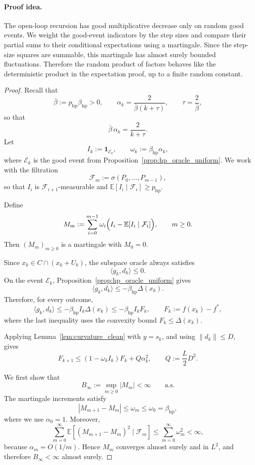 \documentclass{article}
\begin{document}
\paragraph{Proof idea.}
The open-loop recursion has good multiplicative decrease only on random good
events. We weight the good-event indicators by the step sizes and compare their
partial sums to their conditional expectations using a martingale. Since the
step-size squares are summable, this martingale has almost surely bounded
fluctuations. Therefore the random product of factors behaves like the
deterministic product in the expectation proof, up to a finite random constant.
\begin{proof}
Recall that
\[
\bar\beta:=p_{\mathrm{hp}}\beta_{\mathrm{hp}}>0,
\qquad
\alpha_k=\frac{2}{\bar\beta(k+\tau)},
\qquad
\tau=\frac{2}{\bar\beta},
\]
so that
\begin{equation}
\bar\beta\,\alpha_k=\frac{2}{k+\tau}.
\label{eq:barbeta_alpha_identity_as}
\end{equation}
Let
\[
I_k:=\mathbf 1_{\mathcal E_k},
\qquad
\omega_k:=\beta_{\mathrm{hp}}\alpha_k,
\]
where \(\mathcal E_k\) is the good event from
Proposition~\ref{prop:hp_oracle_uniform}. We work with the filtration
\[
\mathcal F_m:=\sigma(P_0,\ldots,P_{m-1}),
\]
so that \(I_i\) is \(\mathcal F_{i+1}\)-measurable and
\(\mathbb E[I_i\mid\mathcal F_i]\ge p_{\mathrm{hp}}\).

Define
\[
M_m
:=
\sum_{i=0}^{m-1}
\omega_i\Bigl(I_i-\mathbb E[I_i\mid\mathcal F_i]\Bigr),
\qquad
m\ge0.
\]
Then \((M_m)_{m\ge0}\) is a martingale with \(M_0=0\).

Since \(x_k\in C\cap(x_k+U_k)\), the subspace oracle always satisfies
\[
\langle g_k,d_k\rangle\le0.
\]
On the event \(\mathcal E_k\), Proposition~\ref{prop:hp_oracle_uniform} gives
\[
\langle g_k,d_k\rangle
\le
-\beta_{\mathrm{hp}}\Delta(x_k).
\]
Therefore, for every outcome,
\[
\langle g_k,d_k\rangle
\le
-\beta_{\mathrm{hp}}I_k\Delta(x_k)
\le
-\beta_{\mathrm{hp}}I_kF_k,
\qquad
F_k:=f(x_k)-f^*,
\]
where the last inequality uses the convexity bound \(F_k\le\Delta(x_k)\).

Applying Lemma~\ref{lem:curvature_clean} with \(y=s_k\), and using
\(\|d_k\|\le D\), gives
\begin{equation}
F_{k+1}
\le
(1-\omega_k I_k)F_k
+
Q\alpha_k^2,
\qquad
Q:=\frac{L}{2}D^2.
\label{eq:hp_recursion_as}
\end{equation}

We first show that
\[
B_\infty:=\sup_{m\ge0}|M_m|<\infty
\qquad\text{a.s.}
\]
The martingale increments satisfy
\[
|M_{m+1}-M_m|
\le
\omega_m
\le
\omega_0
=
\beta_{\mathrm{hp}},
\]
where we use \(\alpha_0=1\). Moreover,
\[
\sum_{m=0}^{\infty}
\mathbb E\!\left[(M_{m+1}-M_m)^2\mid\mathcal F_m\right]
\le
\sum_{m=0}^{\infty}\omega_m^2
<\infty,
\]
because \(\alpha_m=O(1/m)\). Hence \(M_m\) converges almost surely and in
\(L^2\), and therefore \(B_\infty<\infty\) almost surely.


\end{proof}
\end{document}
